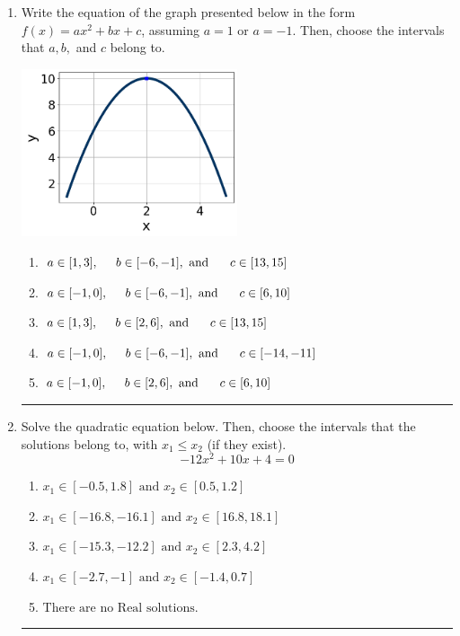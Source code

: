 \documentclass[14pt]{extbook}
\newcommand{\litem}[1]{\item#1\hspace*{-1cm}\rule{\textwidth}{0.4pt}}
\begin{document}
\begin{enumerate}
{\begin{enumerate}[label=\Alph*.]
\end{enumerate} }
\litem{
Write the equation of the graph presented below in the form $f(x)=ax^2+bx+c$, assuming  $a=1$ or $a=-1$. Then, choose the intervals that $a, b,$ and $c$ belong to.
\begin{center}
    \includegraphics[width=0.5\textwidth]{../Figures/quadraticGraphToEquationCopyA.png}
\end{center}
\begin{enumerate}[label=\Alph*.]
\item \( a \in [1, 3], \hspace*{5mm} b \in [-6, -1], \text{ and } \hspace*{5mm} c \in [13, 15] \)
\item \( a \in [-1, 0], \hspace*{5mm} b \in [-6, -1], \text{ and } \hspace*{5mm} c \in [6, 10] \)
\item \( a \in [1, 3], \hspace*{5mm} b \in [2, 6], \text{ and } \hspace*{5mm} c \in [13, 15] \)
\item \( a \in [-1, 0], \hspace*{5mm} b \in [-6, -1], \text{ and } \hspace*{5mm} c \in [-14, -11] \)
\item \( a \in [-1, 0], \hspace*{5mm} b \in [2, 6], \text{ and } \hspace*{5mm} c \in [6, 10] \)

\end{enumerate} }
\litem{
Solve the quadratic equation below. Then, choose the intervals that the solutions belong to, with $x_1 \leq x_2$ (if they exist).\[ -12x^{2} +10 x + 4 = 0 \]\begin{enumerate}[label=\Alph*.]
\item \( x_1 \in [-0.5, 1.8] \text{ and } x_2 \in [0.5, 1.2] \)
\item \( x_1 \in [-16.8, -16.1] \text{ and } x_2 \in [16.8, 18.1] \)
\item \( x_1 \in [-15.3, -12.2] \text{ and } x_2 \in [2.3, 4.2] \)
\item \( x_1 \in [-2.7, -1] \text{ and } x_2 \in [-1.4, 0.7] \)
\item \( \text{There are no Real solutions.} \)


\end{enumerate}}
\end{enumerate}
\end{document}
